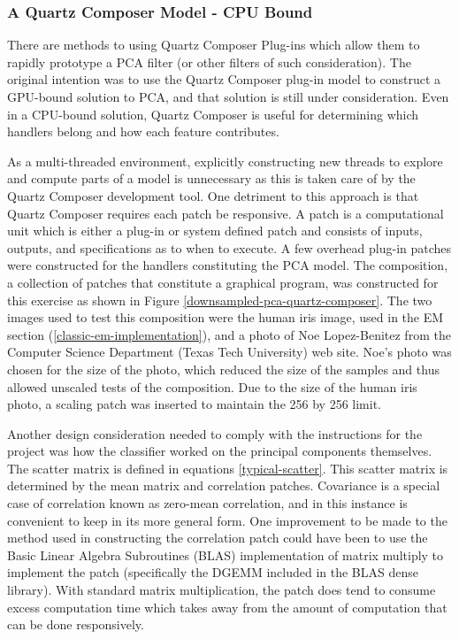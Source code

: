 \documentclass[11pt]{article}
\begin{document}
\subsubsection{A Quartz Composer Model - CPU Bound}
There are methods to using Quartz Composer Plug-ins which allow them to rapidly prototype a PCA filter (or other filters of such consideration).  %
The original %
intention was to use the Quartz Composer plug-in model to construct a GPU-bound solution to PCA, and that solution is still under consideration.   Even in a CPU-bound solution, Quartz Composer is useful for determining which handlers belong and how each feature contributes.  

As a multi-threaded environment, explicitly constructing new threads to explore and compute parts of a model is unnecessary as this is taken care of by the Quartz Composer development tool.   %
One detriment to this approach is that Quartz Composer requires each patch be responsive. A patch is a computational unit which is either a plug-in or system defined patch and consists of inputs, outputs, and specifications as to when to execute.   A few overhead plug-in patches were constructed for the handlers constituting the PCA model.   The composition, a collection of patches that constitute a graphical program, was constructed for this exercise as shown in Figure \ref{downsampled-pca-quartz-composer}.  The two images used to test this composition were the human iris image, used in the EM section (\ref{classic-em-implementation}), and a photo of Noe Lopez-Benitez from the Computer Science Department (Texas Tech University) web site.   Noe's photo was chosen for the size of the photo, which reduced the size of the samples and thus allowed unscaled tests of the composition.   %
Due to the size of the human iris photo, a scaling patch was inserted to maintain the 256 by 256 limit.

Another design consideration needed to comply with the instructions for the project was how the classifier worked on the principal components themselves.  The scatter matrix is defined in equations \ref{typical-scatter}.  This scatter matrix is determined by the mean matrix and correlation patches.  Covariance is a special case of correlation known as zero-mean correlation, and in this instance is convenient to keep in its more general form.  One improvement to be made to the method used in constructing the correlation patch could have been to use the  Basic Linear Algebra Subroutines (BLAS) implementation of matrix multiply to implement the patch (specifically the DGEMM included in the BLAS dense library).   With standard matrix multiplication, the patch does tend to consume excess computation time which takes away from the amount of computation that can be done responsively.  %
\end{document}
